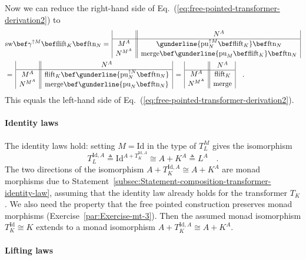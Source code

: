 Now we can reduce the right-hand side of Eq.~(\ref{eq:free-pointed-transformer-derivation2})
to
\begin{align*}
 & \text{sw}\bef\gamma^{\uparrow M}\bef\text{flift}_{K}\bef\text{ftn}_{N}=\,\begin{array}{|c||c|}
 & N^{A}\\
\hline M^{A} & \gunderline{\text{pu}_{N}^{\uparrow M}\bef\text{flift}_{K}}\bef\text{ftn}_{N}\\
N^{M^{A}} & \text{merge}\bef\gunderline{\text{pu}_{M}\bef\text{flift}_{K}}\bef\text{ftn}_{N}
\end{array}\\
 & =\,\begin{array}{|c||c|}
 & N^{A}\\
\hline M^{A} & \text{flift}_{K}\bef\gunderline{\text{pu}_{N}^{\uparrow N}\bef\text{ftn}_{N}}\\
N^{M^{A}} & \text{merge}\bef\gunderline{\text{pu}_{N}\bef\text{ftn}_{N}}
\end{array}\,=\,\begin{array}{|c||c|}
 & N^{A}\\
\hline M^{A} & \text{flift}_{K}\\
N^{M^{A}} & \text{merge}
\end{array}\quad.
\end{align*}
This equals the left-hand side of Eq.~(\ref{eq:free-pointed-transformer-derivation2}).

\paragraph{Identity laws}

The identity laws hold: setting $M=\text{Id}$ in the type of $T_{L}^{M}$
gives the isomorphism
\[
T_{L}^{\text{Id},A}\triangleq\text{Id}^{A+T_{K}^{\text{Id},A}}\cong A+K^{A}\triangleq L^{A}\quad.
\]
The two directions of the isomorphism $A+T_{K}^{\text{Id},A}\cong A+K^{A}$
are monad morphisms due to Statement~\ref{subsec:Statement-composition-transformer-identity-law},
assuming that the identity law already holds for the transformer $T_{K}$.
We also need the property that the free pointed construction preserves
monad morphisms (Exercise~\ref{par:Exercise-mt-3}). Then the assumed
monad isomorphism $T_{K}^{\text{Id}}\cong K$ extends to a monad isomorphism
$A+T_{K}^{\text{Id},A}\cong A+K^{A}$.

\paragraph{Lifting laws}

